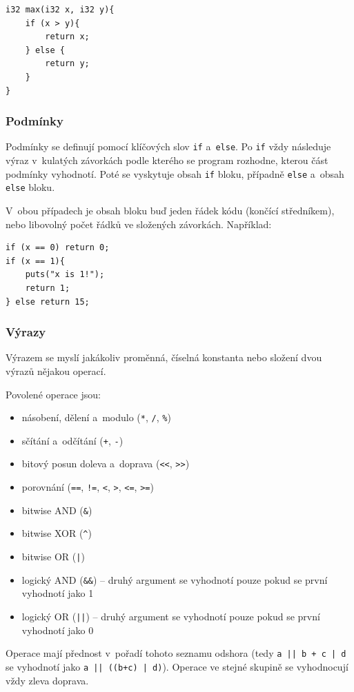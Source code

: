 \documentclass[12pt]{article}
\def\code#1{\texttt{#1}}
\begin{document}
\begin{lstlisting}
i32 max(i32 x, i32 y){
	if (x > y){
		return x;
	} else {
		return y;
	}
}
\end{lstlisting}

\subsubsection{Podmínky}
Podmínky se definují pomocí klíčových slov \code{if} a~\code{else}.
Po \code{if} vždy následuje výraz v~kulatých závorkách podle kterého se program rozhodne, kterou část podmínky vyhodnotí.
Poté se vyskytuje obsah \code{if} bloku, případně \code{else} a~obsah \code{else} bloku.

V~obou případech je obsah bloku buď jeden řádek kódu (končící středníkem), nebo libovolný počet řádků ve složených závorkách.
Například:

\begin{lstlisting}
if (x == 0) return 0;
if (x == 1){
	puts("x is 1!");
	return 1;
} else return 15;
\end{lstlisting}

\subsubsection{Výrazy}
Výrazem se myslí jakákoliv proměnná, číselná konstanta nebo složení dvou výrazů nějakou operací.

Povolené operace jsou:
\begin{itemize}
	\item násobení, dělení a~modulo (\code{*}, \code{/}, \code{\%})
	\item sčítání a~odčítání (\code{+}, \code{-})
	\item bitový posun doleva a~doprava (\code{<<}, \code{>>})
	\item porovnání (\code{==}, \code{!=}, \code{<}, \code{>}, \code{<=}, \code{>=})
	\item bitwise AND (\code{\&})
	\item bitwise XOR (\code{\textasciicircum})
	\item bitwise OR  (\code{|})
	\item logický AND (\code{\&\&}) -- druhý argument se vyhodnotí pouze pokud se první vyhodnotí jako 1
	\item logický OR (\code{||}) -- druhý argument se vyhodnotí pouze pokud se první vyhodnotí jako 0
\end{itemize}
Operace mají přednost v~pořadí tohoto seznamu odshora (tedy \code{a || b + c | d} se vyhodnotí jako \code{a || ((b+c) | d)}).
Operace ve stejné skupině se vyhodnocují vždy zleva doprava.
\end{document}

